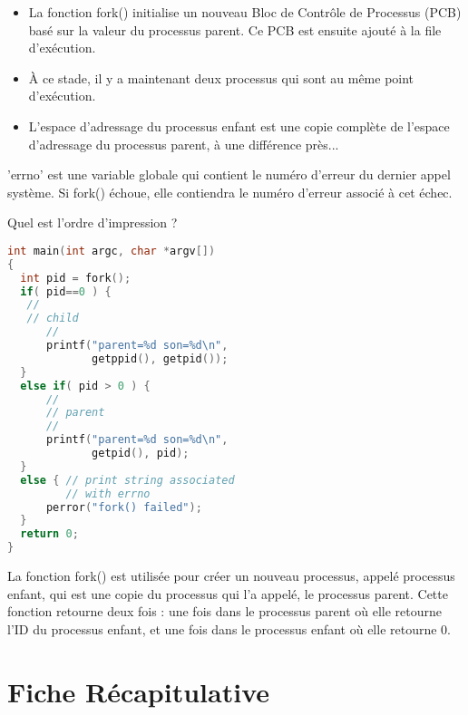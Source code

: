 \documentclass[12pt]{report}
\begin{document}
\begin{itemize} 
\item La fonction fork() initialise un nouveau Bloc de Contrôle de Processus (PCB) basé sur la valeur du processus parent. Ce PCB est ensuite ajouté à la file d'exécution. 
\item À ce stade, il y a maintenant deux processus qui sont au même point d'exécution. 
\item L'espace d'adressage du processus enfant est une copie complète de l'espace d'adressage du processus parent, à une différence près... 
\end{itemize} 

'errno' est une variable globale qui contient le numéro d'erreur du dernier appel système. Si fork() échoue, elle contiendra le numéro d'erreur associé à cet échec. 

Quel est l'ordre d'impression ?
\begin{lstlisting}[language=C] 
int main(int argc, char *argv[]) 
{ 
  int pid = fork(); 
  if( pid==0 ) { 
   // 
   // child 
      // 
      printf("parent=%d son=%d\n", 
             getppid(), getpid()); 
  } 
  else if( pid > 0 ) { 
      // 
      // parent 
      // 
      printf("parent=%d son=%d\n", 
             getpid(), pid); 
  } 
  else { // print string associated 
         // with errno    
      perror("fork() failed");  
  } 
  return 0; 
} 
\end{lstlisting}
\begin{tcolorbox}[ 
colback=yellow!10, 
colframe=yellow, 
title={\fontfamily{lmr}\selectfont \faBookmark\ À retenir}, 
fonttitle=\bfseries, 
fontupper=\fontfamily{lmr}\selectfont, 
boxrule=1pt, 
sharp corners, 
] 
La fonction fork() est utilisée pour créer un nouveau processus, appelé processus enfant, qui est une copie du processus qui l'a appelé, le processus parent. Cette fonction retourne deux fois : une fois dans le processus parent où elle retourne l'ID du processus enfant, et une fois dans le processus enfant où elle retourne 0. 
\end{tcolorbox}


\section*{Fiche Récapitulative}
\end{document}
